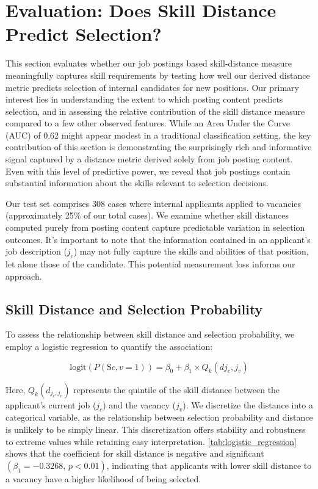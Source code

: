 
\section{Evaluation: Does Skill Distance Predict Selection?}\label{sec:evaluation_skill_distance}

This section evaluates whether our job postings based skill-distance measure meaningfully captures skill requirements by testing how well 
our derived distance metric predicts selection of internal candidates for new positions. Our primary interest lies in understanding the 
extent to which posting content predicts selection, and in assessing the relative contribution of the skill distance measure compared to 
a few other observed features. While an Area Under the Curve (AUC) of 0.62 might appear modest in a traditional classification setting, 
the key contribution of this section is demonstrating the surprisingly rich and informative signal captured by a distance metric derived 
solely from job posting content. Even with this level of predictive power, we reveal that job postings contain substantial information 
about the skills relevant to selection decisions.

Our test set comprises 308 cases where internal applicants applied to vacancies (approximately 25\% of our total cases). 
We examine whether skill distances computed purely from posting content capture predictable variation in selection outcomes. 
It's important to note that the information contained in an applicant's job description ($j_c$) may not fully capture the skills 
and abilities of that position, let alone those of the candidate. This potential measurement loss informs our approach.
 

\subsection{Skill Distance and Selection Probability}

To assess the relationship between skill distance and selection probability, we employ a logistic regression to quantify the association:

\begin{equation}
\text{logit}(P(\text{S}{c,v} = 1)) = \beta_0 + \beta_1 \times Q_k(d{j_c, j_v})
\end{equation} 

Here, \( Q_k(d_{j_c, j_v}) \) represents the quintile of the skill distance between the applicant's current job (\( j_c \)) and the vacancy (\( j_v \)). We discretize the 
distance into a categorical variable, as the relationship between selection probability and distance is unlikely to be simply linear. This discretization offers stability 
and robustness to extreme values while retaining easy interpretation. \autoref{tab:logistic_regression} shows that the coefficient for skill distance is negative and 
significant \((\beta_1 = -0.3268, \, p < 0.01)\), indicating that applicants with lower skill distance to a vacancy have a higher likelihood of being selected.


